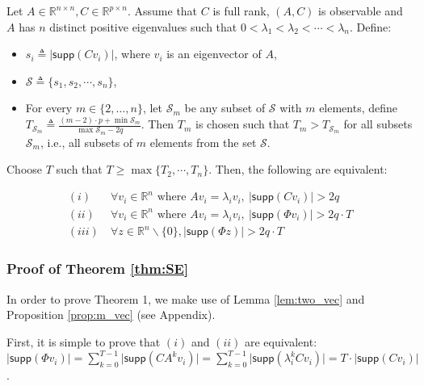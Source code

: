 \documentclass[../../thesis.tex]{subfiles}
\begin{document}
\begin{theorem}\label{thm:SE} 
Let $A \in \mathbb{R}^{n\times n}, C \in \mathbb{R}^{p\times n}$. Assume that $C$ is full rank, $(A,C)$ is observable and $A$ has $n$ distinct positive eigenvalues such that $0 < \lambda_1 < \lambda_2 < \cdots < \lambda_n$. 
Define:
\begin{itemize}
\item
$s_i \triangleq \lvert \textsf{supp} (Cv_i) \vert$, where $v_i$ is an eigenvector of $A$, 
\item
$\mathcal{S} \triangleq \{ s_1, s_2, \cdots, s_n \}$,
\item
For every $m \in \{2, \ldots, n\}$, let $\mathcal{S}_m$ be any subset of $\mathcal{S}$ with $m$ elements, define $T_{\mathcal{S}_m} \triangleq \frac {  (m-2) \cdot p + \min \mathcal{S}_m } {\max \mathcal{S}_m - 2q }$.
Then $T_m$ is chosen such that $T_m > T_{\mathcal{S}_m}$ for all subsets $\mathcal{S}_m$, i.e., all subsets of $m$ elements from the set $\mathcal{S}$.
\end{itemize}

Choose $T$ such that  $T \ge \max \{ T_2, \cdots, T_n \}$.
Then, the following are equivalent:

\begin{equation}
\begin{aligned} 
 (i)  &~\forall v_i \in \mathbb{R}^n \text{ where } Av_i =\lambda_i v_i, ~ \lvert \textsf{supp}(Cv_i) \rvert > 2q  \\
  (ii)  &~\forall v_i \in \mathbb{R}^n \text{ where } Av_i =\lambda_i v_i,  ~\lvert \textsf{supp} (\Phi v_i) \rvert > 2q \cdot T  \\
  (iii) &~  \forall z \in \mathbb{R}^n\backslash \{0 \}, \lvert \textsf{supp} (\Phi z) \rvert > 2 q \cdot T  \nonumber %
\label{eq:new_condition}
\end{aligned}
\end{equation}
\end{theorem}


\subsubsection{Proof of Theorem \ref{thm:SE}}
In order to prove Theorem 1, we make use of Lemma \ref{lem:two_vec} and Proposition \ref{prop:m_vec} (see Appendix).

First, it is simple to prove that $(i)$ and $(ii)$ are equivalent: $\lvert \textsf{supp} (\Phi v_i) \rvert = \sum_{k=0}^{T-1} \lvert \textsf{supp} (CA^k v_i ) \rvert = \sum_{k=0}^{T-1} \lvert  \textsf{supp} (\lambda_i^k C v_i )\rvert  = T\cdot  \lvert \textsf{supp} (C v_i) \rvert  $. 
\end{document}
